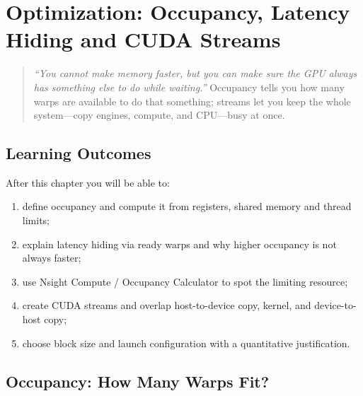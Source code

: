 \chapter{Optimization: Occupancy, Latency Hiding and CUDA Streams}
\label{ch:optimization}
\sloppy

\begin{quote}
\emph{``You cannot make memory faster, but you can make sure the GPU always has something else to do while waiting.''} Occupancy tells you how many warps are available to do that something; streams let you keep the whole system---copy engines, compute, and CPU---busy at once.
\end{quote}

\noindent{}
\vspace{0.4em}

\section*{Learning Outcomes}
After this chapter you will be able to:
\begin{enumerate}[label=(L\arabic*)]
    \item define occupancy and compute it from registers, shared memory and thread limits;
    \item explain latency hiding via ready warps and why higher occupancy is not always faster;
    \item use Nsight Compute / Occupancy Calculator to spot the limiting resource;
    \item create CUDA streams and overlap host-to-device copy, kernel, and device-to-host copy;
    \item choose block size and launch configuration with a quantitative justification.
\end{enumerate}

\section{Occupancy: How Many Warps Fit?}
\label{sec:occupancy}
